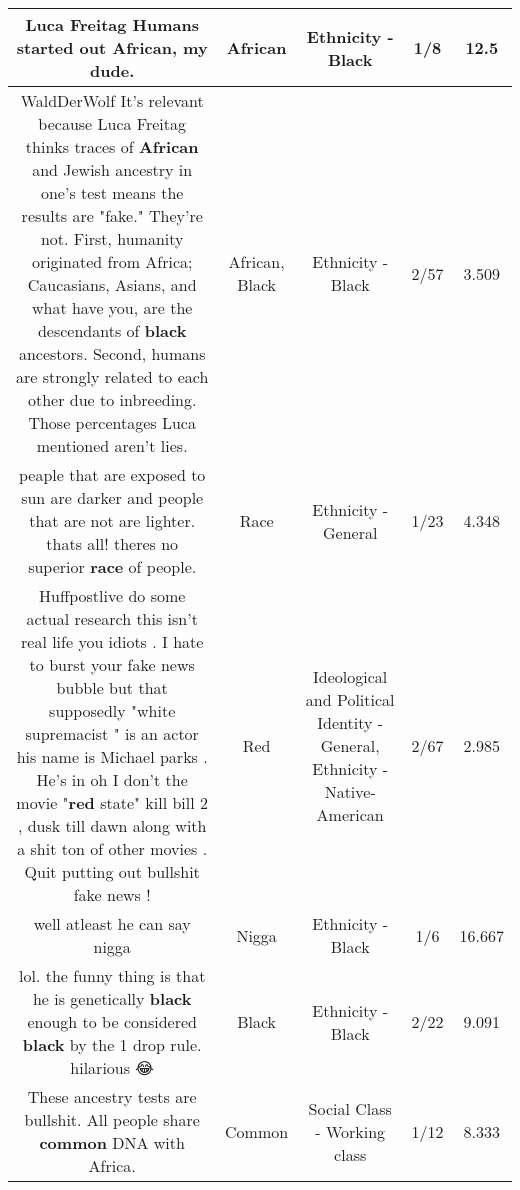 \documentclass[11pt]{article}
\newlength\mylength
\begin{document}
\begin{center}
\begin{longtable}{|C{.65\mylength}|C{.30\mylength}|C{.12\mylength}|C{.12\mylength}|C{.12\mylength}|}
  \small Luca Freitag Humans started out \textbf{African}, my dude.\normalsize   & African & Ethnicity - Black & 1/8 & 12.5 \\  \hline
  \small WaldDerWolf It's relevant because Luca  Freitag thinks traces of \textbf{African} and Jewish ancestry in one's test means the results are "fake." They're not. First, humanity originated from Africa; Caucasians, Asians, and what have you, are the descendants of \textbf{black} ancestors. Second, humans are strongly related to each other due to inbreeding. Those percentages Luca mentioned aren't lies.\normalsize   & African, Black & Ethnicity - Black & 2/57 & 3.509 \\  \hline
  \small peaple that are exposed to sun are darker and people that are not are lighter. thats all! theres no superior \textbf{race} of people.\normalsize   & Race & Ethnicity - General & 1/23 & 4.348 \\  \hline
  \small Huffpostlive do some actual research this isn't real life  you idiots . I hate to burst your fake news bubble but  that supposedly "white supremacist " is an actor his name is Michael parks . He's in oh I don't the movie "\textbf{r\textbf{ed}} state" kill bill 2 , dusk till dawn along with a shit ton of other movies . Quit putting out bullshit fake news !\normalsize   & Red &  Ideological and Political Identity - General, Ethnicity - Native-American & 2/67 & 2.985 \\  \hline
  \small well atleast he can say nigga\normalsize   & Nigga & Ethnicity - Black & 1/6 & 16.667 \\  \hline
  \small lol. the funny thing is that he is genetically \textbf{black} enough to be considered \textbf{black} by the 1 drop rule. hilarious 😂\normalsize   & Black & Ethnicity - Black & 2/22 & 9.091 \\  \hline
  \small These ancestry tests are bullshit. All people share \textbf{common} DNA with Africa.\normalsize   & Common & Social Class - Working class & 1/12 & 8.333 \\  \hline

\end{longtable}
\end{center}
\end{document}
